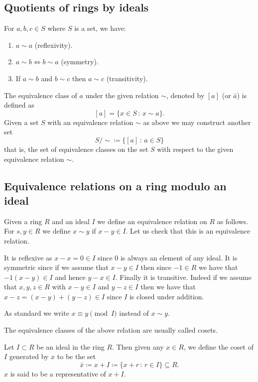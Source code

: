 \documentclass[10pt, a4paper]{article}
\begin{document}
\subsection{Quotients of rings by ideals}

For $a, b, c \in S$ where $S$ is a set,
we have:
\begin{enumerate}[label = \roman*)]
    \item $a \sim a$
    (reflexivity).

    \item $a \sim b \iff b \sim a$
    (symmetry).

    \item If $a \sim b$ and $b \sim c$ then $a \sim c$
    (transitivity).
\end{enumerate}

The equivalence class of $a$ under the given relation $\sim$,
denoted by $[a]$
(or $\bar{a}$)
is defined as
\[
[a] = \{x \in S\,:\, x \sim a\}.
\]
Given a set $S$ with an equivalence relation $\sim$ as above we may construct another set
\[
S / \sim \coloneqq \{[a]\,:\, a \in S\}
\]
that is,
the set of equivalence classes on the set $S$ with respect to the given equivalence relation $\sim$.

\subsection{Equivalence relations on a ring modulo an ideal}
Given a ring $R$ and an ideal $I$ we define an equivalence relation on $R$ as follows.
For $s, y \in R$ we define $x \sim y$ if $x - y \in I$.
Let us check that this is an equivalence relation.

It is reflexive as $x - x = 0 \in I$ since $0$ is always an element of any ideal.
It is symmetric since if we assume that $x - y \in I$ then since $-1 \in R$ we have that $-1(x - y) \in I$ and hence $y - x \in I$.
Finally it is transitive.
Indeed if we assume that $x, y, z \in R$ with $x - y \in I$ and $y - z \in I$ then we have that $x - z = (x - y) + (y - z) \in I$ since $I$ is closed under addition.

As standard we write $x \equiv y\pmod{I}$ instead of $x \sim y$.

The equivalence classes of the above relation are usually called cosets.

\begin{definition}[Cosets]
    Let $I \subset R$ be an ideal in the ring $R$.
    Then given any $x \in R$,
    we define the coset of $I$ generated by $x$ to be the set
    \[
    \bar{x} \coloneqq x + I \coloneqq \{x + r\,:\, r \in I\} \subseteq R.
    \]
    $x$ is said to be a representative of $x + I$.
\end{definition}
\end{document}
